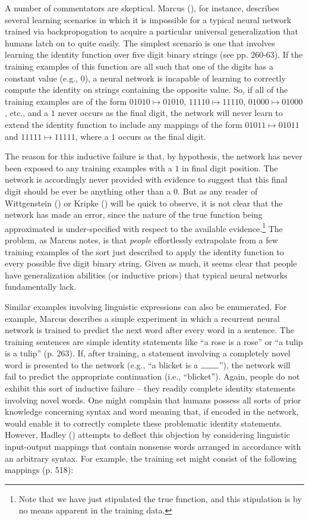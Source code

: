 A number of commentators are skeptical. Marcus (\citeyear{Marcus:1998}), for instance, describes several learning scenarios in which it is impossible for a typical neural network trained via backpropogation to acquire a particular universal generalization that humans latch on to quite easily. The simplest scenario is one that involves learning the identity function over five digit binary strings (see pp. 260-63). If the training examples of this function are all such that one of the digits has a constant value (e.g., $0$), a neural network is incapable of learning to correctly compute the identity on strings containing the opposite value. So, if all of the training examples are of the form $01010 \mapsto 01010$, $11110 \mapsto 11110$, $01000 \mapsto 01000$, etc., and a $1$ never occurs as the final digit, the network will never learn to extend the identity function to include any mappings of the form $01011 \mapsto 01011$ and $11111 \mapsto 11111$, where a $1$ occurs as the final digit. 

The reason for this inductive failure is that, by hypothesis, the network has never been exposed to any training examples with a $1$ in final digit position. The network is accordingly never provided with evidence to suggest that this final digit should be ever be anything other than a $0$. But as any reader of Wittgenstein (\citeyear{Wittgenstein:1953}) or Kripke (\citeyear{Kripke:1982}) will be quick to observe, it is not clear that the network has made an error, since the nature of the true function being approximated is under-specified with respect to the available evidence.\footnote{Note that we have just stipulated the true function, and this stipulation is by no means apparent in the training data.} The problem, as Marcus notes, is that \textit{people} effortlessly extrapolate from a few training examples of the sort just described to apply the identity function to every possible five digit binary string. Given as much, it seems clear that people have generalization abilities (or inductive priors) that typical neural networks fundamentally lack.

Similar examples involving linguistic expressions can also be enumerated. For example, Marcus describes a simple experiment in which a recurrent neural network is trained to predict the next word after every word in a sentence. The training sentences are simple identity statements like ``a rose is a rose'' or ``a tulip is a tulip'' (p. 263). If, after training, a statement involving a completely novel word is presented to the network (e.g., ``a blicket is a $\rule{0.75cm}{0.15mm}$''), the network will fail to predict the appropriate continuation (i.e., ``blicket''). Again, people do not exhibit this sort of inductive failure -- they readily complete identity statements involving novel words. One might complain that humans possess all sorts of prior knowledge concerning syntax and word meaning that, if encoded in the network, would enable it to correctly complete these problematic identity statements. However, Hadley (\citeyear{Hadley:2009}) attempts to deflect this objection by considering linguistic input-output mappings that contain nonsense words arranged in accordance with an arbitrary syntax. For example, the training set might consist of the following mappings (p. 518):

